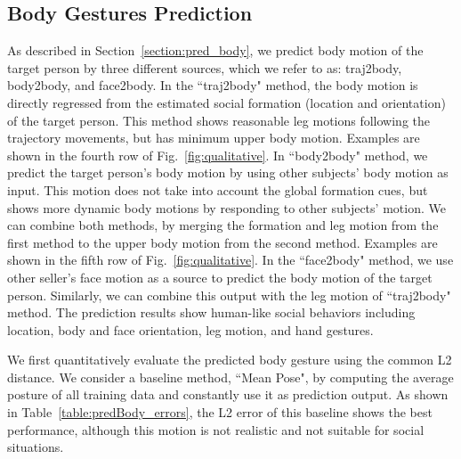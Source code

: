 \subsection{Body Gestures Prediction}
As described in Section~\ref{section:pred_body}, we predict body motion of the target person by three different sources, which we refer to as: traj2body, body2body, and face2body. In the ``traj2body" method, the body motion is directly regressed from the estimated social formation (location and orientation) of the target person. This method shows reasonable leg motions following the trajectory movements, but has minimum upper body motion. Examples are shown in the fourth row of Fig.~\ref{fig:qualitative}. In ``body2body" method, we predict the target person's body motion by using other subjects' body motion as input. This motion does not take into account the global formation cues, but shows more dynamic body motions by responding to other subjects' motion. We can combine both methods, by merging the formation and leg motion from the first method to the upper body motion from the second method. Examples are shown in the fifth row of Fig.~\ref{fig:qualitative}. In the ``face2body" method, we use other seller's face motion as a source to predict the body motion of the target person. Similarly, we can combine this output with the leg motion of ``traj2body" method. The prediction results show human-like social behaviors including location, body and face orientation, leg motion, and hand gestures. 

We first quantitatively evaluate the predicted body gesture using the common L2 distance. We consider a baseline method, ``Mean Pose", by computing the average posture of all training data and constantly use it as prediction output. As shown in Table~\ref{table:predBody_errors}, the L2 error of this baseline shows the best performance, although this motion is not realistic and not suitable for social situations.

